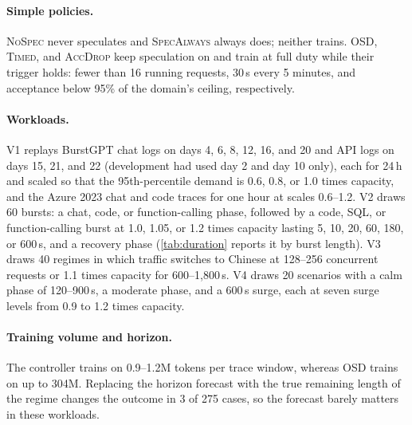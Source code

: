 \documentclass{article}
\newcommand{\pol}[1]{\textsc{#1}}
\begin{document}
\paragraph{Simple policies.} \pol{NoSpec} never speculates and \pol{SpecAlways} always does; neither trains. \pol{OSD}, \pol{Timed}, and \pol{AccDrop} keep speculation on and train at full duty while their trigger holds: fewer than 16 running requests, 30\,s every 5 minutes, and acceptance below 95\% of the domain's ceiling, respectively.

\paragraph{Workloads.} V1 replays BurstGPT \citep{wang2024burstgpt} chat logs on days 4, 6, 8, 12, 16, and 20 and API logs on days 15, 21, and 22 (development had used day 2 and day 10 only), each for 24\,h and scaled so that the 95th-percentile demand is 0.6, 0.8, or 1.0 times capacity, and the Azure 2023 chat and code traces \citep{patel2024splitwise} for one hour at scales 0.6--1.2. V2 draws 60 bursts: a chat, code, or function-calling phase, followed by a code, SQL, or function-calling burst at 1.0, 1.05, or 1.2 times capacity lasting 5, 10, 20, 60, 180, or 600\,s, and a recovery phase (\cref{tab:duration} reports it by burst length). V3 draws 40 regimes in which traffic switches to Chinese at 128--256 concurrent requests or 1.1 times capacity for 600--1{,}800\,s. V4 draws 20 scenarios with a calm phase of 120--900\,s, a moderate phase, and a 600\,s surge, each at seven surge levels from 0.9 to 1.2 times capacity.

\paragraph{Training volume and horizon.} The controller trains on 0.9--1.2M tokens per trace window, whereas \pol{OSD} trains on up to 304M. Replacing the horizon forecast with the true remaining length of the regime changes the outcome in 3 of 275 cases, so the forecast barely matters in these workloads.
\end{document}
